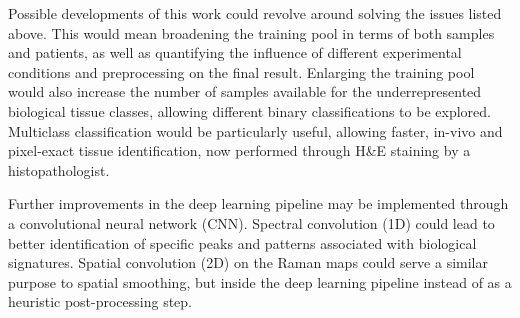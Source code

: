 Possible developments of this work could revolve around solving the issues listed above. This would mean broadening the training pool in terms of both samples and patients, as well as quantifying the influence of different experimental conditions and preprocessing on the final result. Enlarging the training pool would also increase the number of samples available for the underrepresented biological tissue classes, allowing different binary classifications to be explored. Multiclass classification would be particularly useful, allowing faster, in-vivo and pixel-exact tissue identification, now performed through H\&E staining by a histopathologist.

Further improvements in the deep learning pipeline may be implemented through a convolutional neural network (CNN). Spectral convolution (1D) could lead to better identification of specific peaks and patterns associated with biological signatures. Spatial convolution (2D) on the Raman maps could serve a similar purpose to spatial smoothing, but inside the deep learning pipeline instead of as a heuristic post-processing step.
